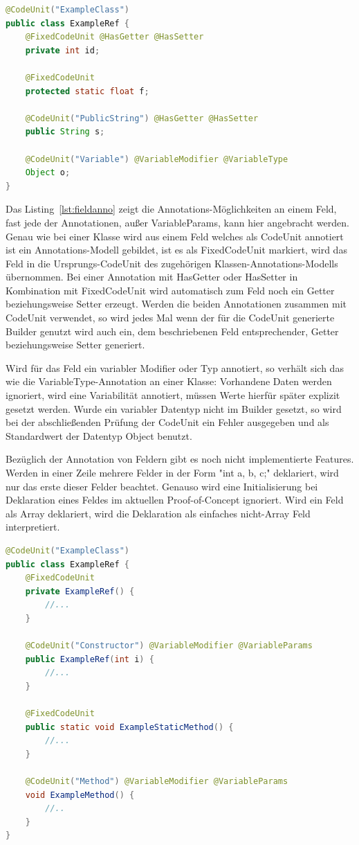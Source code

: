 \documentclass[12pt,oneside,a4paper,parskip]{scrbook}
\begin{document}
\begin{lstlisting}[label=lst:fieldanno,
language=java,
firstnumber=1,
caption=Darstellung der Annotations-Möglichkeiten an einem Feld.]
@CodeUnit("ExampleClass")
public class ExampleRef {
	@FixedCodeUnit @HasGetter @HasSetter
	private int id;

	@FixedCodeUnit
	protected static float f;

	@CodeUnit("PublicString") @HasGetter @HasSetter
	public String s;

	@CodeUnit("Variable") @VariableModifier @VariableType
	Object o;
}
\end{lstlisting}

Das Listing~\ref{lst:fieldanno} zeigt die Annotations-Möglichkeiten an einem Feld, fast jede der Annotationen, außer VariableParams, kann hier angebracht werden. Genau wie bei einer Klasse wird aus einem Feld welches als CodeUnit annotiert ist ein Annotations-Modell gebildet, ist es als FixedCodeUnit markiert, wird das Feld in die Ursprungs-CodeUnit des zugehörigen Klassen-Annotations-Modells übernommen. Bei einer Annotation mit HasGetter oder HasSetter in Kombination mit FixedCodeUnit wird automatisch zum Feld noch ein Getter beziehungsweise Setter erzeugt. Werden die beiden Annotationen zusammen mit CodeUnit verwendet, so wird jedes Mal wenn der für die CodeUnit generierte Builder genutzt wird auch ein, dem beschriebenen Feld entsprechender, Getter beziehungsweise Setter generiert. 

Wird für das Feld ein variabler Modifier oder Typ annotiert, so verhält sich das wie die VariableType-Annotation an einer Klasse: Vorhandene Daten werden ignoriert, wird eine Variabilität annotiert, müssen Werte hierfür später explizit gesetzt werden. Wurde ein variabler Datentyp nicht im Builder gesetzt, so wird bei der abschließenden Prüfung der CodeUnit ein Fehler ausgegeben und als Standardwert der Datentyp Object benutzt.

Bezüglich der Annotation von Feldern gibt es noch nicht implementierte Features. Werden in einer Zeile mehrere Felder in der Form "int a, b, c;" deklariert, wird nur das erste dieser Felder beachtet. Genauso wird eine Initialisierung bei Deklaration eines Feldes im aktuellen Proof-of-Concept ignoriert. Wird ein Feld als Array deklariert, wird die Deklaration als einfaches nicht-Array Feld interpretiert.

\begin{lstlisting}[label=lst:constrmethoanno,
language=java,
firstnumber=1,
caption=Darstellung der Annotations-Möglichkeiten von Konstruktoren und Methoden.]
@CodeUnit("ExampleClass")
public class ExampleRef {
	@FixedCodeUnit
	private ExampleRef() {
		//...
	}
	
	@CodeUnit("Constructor") @VariableModifier @VariableParams
	public ExampleRef(int i) {
		//...
	}
	
	@FixedCodeUnit
	public static void ExampleStaticMethod() {
		//...
	}
	
	@CodeUnit("Method") @VariableModifier @VariableParams
	void ExampleMethod() {
		//..
	}
}
\end{lstlisting}
\end{document}
